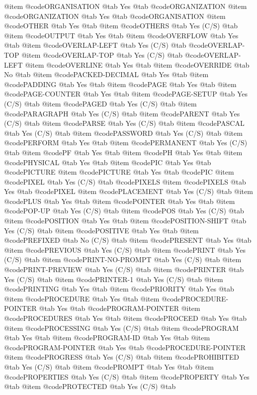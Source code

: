 @item @code{ORGANISATION} @tab Yes @tab @code{ORGANIZATION}
@item @code{ORGANIZATION} @tab Yes @tab @code{ORGANISATION}
@item @code{OTHER} @tab Yes @tab 
@item @code{OTHERS} @tab Yes	(C/S) @tab 
@item @code{OUTPUT} @tab Yes @tab 
@item @code{OVERFLOW} @tab Yes @tab 
@item @code{OVERLAP-LEFT} @tab Yes	(C/S) @tab @code{OVERLAP-TOP}
@item @code{OVERLAP-TOP} @tab Yes	(C/S) @tab @code{OVERLAP-LEFT}
@item @code{OVERLINE} @tab Yes @tab 
@item @code{OVERRIDE} @tab No @tab 
@item @code{PACKED-DECIMAL} @tab Yes @tab 
@item @code{PADDING} @tab Yes @tab 
@item @code{PAGE} @tab Yes @tab 
@item @code{PAGE-COUNTER} @tab Yes @tab 
@item @code{PAGE-SETUP} @tab Yes	(C/S) @tab 
@item @code{PAGED} @tab Yes	(C/S) @tab 
@item @code{PARAGRAPH} @tab Yes	(C/S) @tab 
@item @code{PARENT} @tab Yes	(C/S) @tab 
@item @code{PARSE} @tab Yes	(C/S) @tab 
@item @code{PASCAL} @tab Yes	(C/S) @tab 
@item @code{PASSWORD} @tab Yes	(C/S) @tab 
@item @code{PERFORM} @tab Yes @tab 
@item @code{PERMANENT} @tab Yes	(C/S) @tab 
@item @code{PF} @tab Yes @tab 
@item @code{PH} @tab Yes @tab 
@item @code{PHYSICAL} @tab Yes @tab 
@item @code{PIC} @tab Yes @tab @code{PICTURE}
@item @code{PICTURE} @tab Yes @tab @code{PIC}
@item @code{PIXEL} @tab Yes	(C/S) @tab @code{PIXELS}
@item @code{PIXELS} @tab Yes @tab @code{PIXEL}
@item @code{PLACEMENT} @tab Yes	(C/S) @tab 
@item @code{PLUS} @tab Yes @tab 
@item @code{POINTER} @tab Yes @tab 
@item @code{POP-UP} @tab Yes	(C/S) @tab 
@item @code{POS} @tab Yes	(C/S) @tab 
@item @code{POSITION} @tab Yes @tab 
@item @code{POSITION-SHIFT} @tab Yes	(C/S) @tab 
@item @code{POSITIVE} @tab Yes @tab 
@item @code{PREFIXED} @tab No	(C/S) @tab 
@item @code{PRESENT} @tab Yes @tab 
@item @code{PREVIOUS} @tab Yes	(C/S) @tab 
@item @code{PRINT} @tab Yes	(C/S) @tab 
@item @code{PRINT-NO-PROMPT} @tab Yes	(C/S) @tab 
@item @code{PRINT-PREVIEW} @tab Yes	(C/S) @tab 
@item @code{PRINTER} @tab Yes	(C/S) @tab 
@item @code{PRINTER-1} @tab Yes	(C/S) @tab 
@item @code{PRINTING} @tab Yes @tab 
@item @code{PRIORITY} @tab Yes @tab 
@item @code{PROCEDURE} @tab Yes @tab 
@item @code{PROCEDURE-POINTER} @tab Yes @tab @code{PROGRAM-POINTER}
@item @code{PROCEDURES} @tab Yes @tab 
@item @code{PROCEED} @tab Yes @tab 
@item @code{PROCESSING} @tab Yes	(C/S) @tab 
@item @code{PROGRAM} @tab Yes @tab 
@item @code{PROGRAM-ID} @tab Yes @tab 
@item @code{PROGRAM-POINTER} @tab Yes @tab @code{PROCEDURE-POINTER}
@item @code{PROGRESS} @tab Yes	(C/S) @tab 
@item @code{PROHIBITED} @tab Yes	(C/S) @tab 
@item @code{PROMPT} @tab Yes @tab 
@item @code{PROPERTIES} @tab Yes	(C/S) @tab 
@item @code{PROPERTY} @tab Yes @tab 
@item @code{PROTECTED} @tab Yes	(C/S) @tab 
